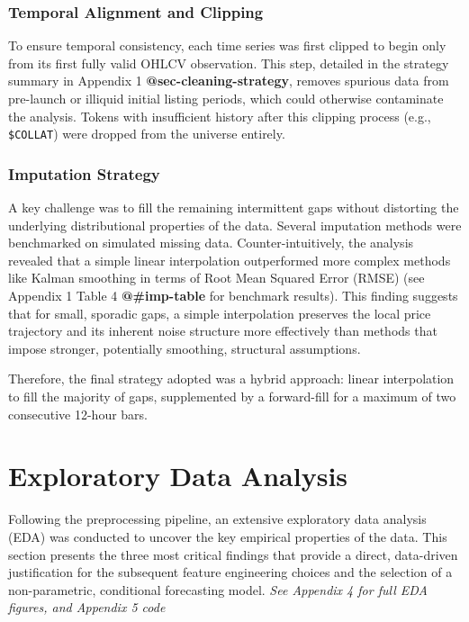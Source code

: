 \documentclass[
  a4paper,
  DIV=11,
  numbers=noendperiod]{scrreprt}
\begin{document}
\subsubsection{Temporal Alignment and
Clipping}\label{temporal-alignment-and-clipping}

To ensure temporal consistency, each time series was first clipped to
begin only from its first fully valid OHLCV observation. This step,
detailed in the strategy summary in Appendix 1
\textbf{@sec-cleaning-strategy}, removes spurious data from pre-launch
or illiquid initial listing periods, which could otherwise contaminate
the analysis. Tokens with insufficient history after this clipping
process (e.g., \texttt{\$COLLAT}) were dropped from the universe
entirely.

\subsubsection{Imputation Strategy}\label{imputation-strategy}

A key challenge was to fill the remaining intermittent gaps without
distorting the underlying distributional properties of the data. Several
imputation methods were benchmarked on simulated missing data.
Counter-intuitively, the analysis revealed that a simple linear
interpolation outperformed more complex methods like Kalman smoothing in
terms of Root Mean Squared Error (RMSE) (see Appendix 1 Table 4
\textbf{@\#imp-table} for benchmark results). This finding suggests that
for small, sporadic gaps, a simple interpolation preserves the local
price trajectory and its inherent noise structure more effectively than
methods that impose stronger, potentially smoothing, structural
assumptions.

Therefore, the final strategy adopted was a hybrid approach: linear
interpolation to fill the majority of gaps, supplemented by a
forward-fill for a maximum of two consecutive 12-hour bars.

\section{Exploratory Data Analysis}\label{exploratory-data-analysis}

Following the preprocessing pipeline, an extensive exploratory data
analysis (EDA) was conducted to uncover the key empirical properties of
the data. This section presents the three most critical findings that
provide a direct, data-driven justification for the subsequent feature
engineering choices and the selection of a non-parametric, conditional
forecasting model. \emph{See Appendix 4 for full EDA figures, and
Appendix 5 code}
\end{document}
